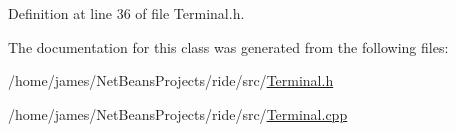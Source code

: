 Definition at line 36 of file Terminal.\-h.



The documentation for this class was generated from the following files\-:\begin{DoxyCompactItemize}
\item 
/home/james/\-Net\-Beans\-Projects/ride/src/\hyperlink{_terminal_8h}{Terminal.\-h}\item 
/home/james/\-Net\-Beans\-Projects/ride/src/\hyperlink{_terminal_8cpp}{Terminal.\-cpp}\end{DoxyCompactItemize}
